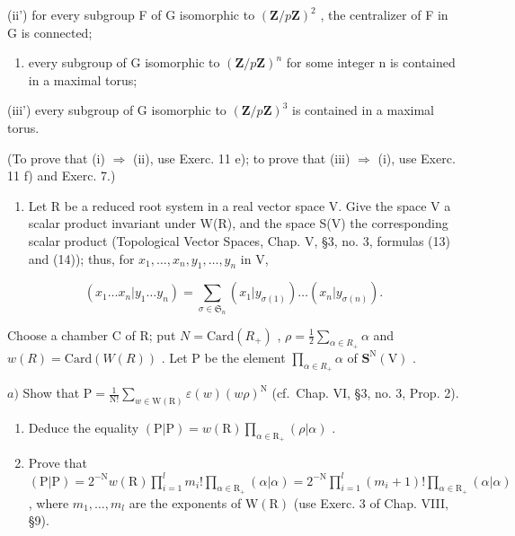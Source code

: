 \begin{enumerate}
(ii') for every subgroup F of G isomorphic to \((\mathbf{Z}/p\mathbf{Z})^{2}\) , the centralizer of F in G is connected;

\begin{enumerate}
\def\labelenumi{(\roman{enumi})}
\setcounter{enumi}{2}
\tightlist
\item
  every subgroup of G isomorphic to \((\mathbf{Z}/p\mathbf{Z})^{n}\) for some integer n is contained in a maximal torus;
\end{enumerate}

(iii') every subgroup of G isomorphic to \((\mathbf{Z}/p\mathbf{Z})^{3}\) is contained in a maximal torus.

(To prove that (i) \(\Longrightarrow\) (ii), use Exerc. 11 e); to prove that (iii) \(\Longrightarrow\) (i), use Exerc. 11 f) and Exerc. 7.)


\begin{enumerate}
\def\labelenumi{\arabic{enumi})}
\tightlist
\item
  Let R be a reduced root system in a real vector space V. Give the space V a scalar product invariant under W(R), and the space S(V) the corresponding scalar product (Topological Vector Spaces, Chap. V, §3, no. 3, formulas (13) and (14)); thus, for \(x_{1},\ldots,x_{n},y_{1},\ldots,y_{n}\) in V,
\end{enumerate}

\[
(x _ {1} \dots x _ {n} | y _ {1} \dots y _ {n}) = \sum_ {\sigma \in \mathfrak {S} _ {n}} (x _ {1} | y _ {\sigma (1)}) \dots (x _ {n} | y _ {\sigma (n)}).
\]

Choose a chamber C of R; put \(N = \text{Card}(R_{+})\) , \(\rho = \frac{1}{2} \sum_{\alpha \in R_{+}} \alpha\) and \(w(R) = \text{Card}(W(R))\) . Let P be the element \(\prod_{\alpha \in R_{+}} \alpha\) of \(\mathbf{S}^{\mathrm{N}}(\mathrm{V})\) .

\(a)\) Show that \(\mathrm{P} = \frac{1}{\mathrm{N!}}\sum_{w\in \mathrm{W(R)}}\varepsilon (w)(w\rho)^{\mathrm{N}}\) (cf.~Chap. VI, §3, no. 3, Prop. 2).

\begin{enumerate}
\def\labelenumi{\alph{enumi})}
\setcounter{enumi}{1}
\item
  Deduce the equality \((\mathrm{P}|\mathrm{P}) = w(\mathrm{R})\prod_{\alpha \in \mathrm{R}_{+}}(\rho |\alpha)\) .
\item
  Prove that \((\mathrm{P}|\mathrm{P}) = 2^{-\mathrm{N}}w(\mathrm{R})\prod_{i = 1}^{l}m_i!\prod_{\alpha \in \mathrm{R}_+}(\alpha |\alpha) = 2^{-\mathrm{N}}\prod_{i = 1}^{l}(m_i + 1)!\prod_{\alpha \in \mathrm{R}_+}(\alpha |\alpha)\) , where \(m_{1},\ldots ,m_{l}\) are the exponents of \(\mathrm{W(R)}\) (use Exerc. 3 of Chap. VIII, §9).
\end{enumerate}


\end{enumerate}
